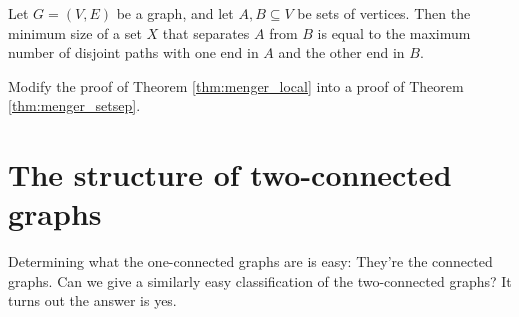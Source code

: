 \documentclass[nobib]{tufte-handout}
\begin{document}
\begin{theorem}[Menger]\label{thm:menger_setsep}
  Let $G = (V,E)$ be a graph, and let $A, B \subseteq V$ be sets of vertices. Then the minimum size of a set $X$ that separates $A$ from $B$ is equal to the maximum number of disjoint paths with one end in $A$ and the other end in $B$.
\end{theorem}

\begin{xca}
  Modify the proof of Theorem \ref{thm:menger_local} into a proof of Theorem \ref{thm:menger_setsep}.
\end{xca}

\section{The structure of two-connected graphs}

Determining what the one-connected graphs are is easy: They're the connected graphs. Can we give a similarly easy classification of the two-connected graphs? It turns out the answer is yes.
\end{document}
